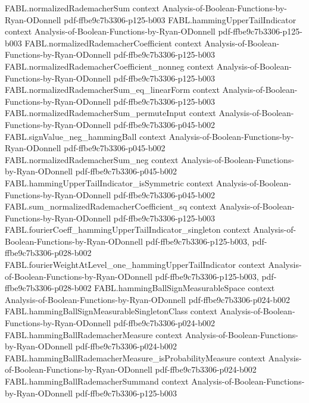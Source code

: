 \begin{theorem}
\proofstep
  {FABL.normalizedRademacherSum}
  {context}
  {Analysis-of-Boolean-Functions-by-Ryan-ODonnell}
  {pdf-ffbe9c7b3306-p125-b003}
\proofstep
  {FABL.hammingUpperTailIndicator}
  {context}
  {Analysis-of-Boolean-Functions-by-Ryan-ODonnell}
  {pdf-ffbe9c7b3306-p125-b003}
\proofstep
  {FABL.normalizedRademacherCoefficient}
  {context}
  {Analysis-of-Boolean-Functions-by-Ryan-ODonnell}
  {pdf-ffbe9c7b3306-p125-b003}
\proofstep
  {FABL.normalizedRademacherCoefficient_nonneg}
  {context}
  {Analysis-of-Boolean-Functions-by-Ryan-ODonnell}
  {pdf-ffbe9c7b3306-p125-b003}
\proofstep
  {FABL.normalizedRademacherSum_eq_linearForm}
  {context}
  {Analysis-of-Boolean-Functions-by-Ryan-ODonnell}
  {pdf-ffbe9c7b3306-p125-b003}
\proofstep
  {FABL.normalizedRademacherSum_permuteInput}
  {context}
  {Analysis-of-Boolean-Functions-by-Ryan-ODonnell}
  {pdf-ffbe9c7b3306-p045-b002}
\proofstep
  {FABL.signValue_neg_hammingBall}
  {context}
  {Analysis-of-Boolean-Functions-by-Ryan-ODonnell}
  {pdf-ffbe9c7b3306-p045-b002}
\proofstep
  {FABL.normalizedRademacherSum_neg}
  {context}
  {Analysis-of-Boolean-Functions-by-Ryan-ODonnell}
  {pdf-ffbe9c7b3306-p045-b002}
\proofstep
  {FABL.hammingUpperTailIndicator_isSymmetric}
  {context}
  {Analysis-of-Boolean-Functions-by-Ryan-ODonnell}
  {pdf-ffbe9c7b3306-p045-b002}
\proofstep
  {FABL.sum_normalizedRademacherCoefficient_sq}
  {context}
  {Analysis-of-Boolean-Functions-by-Ryan-ODonnell}
  {pdf-ffbe9c7b3306-p125-b003}
\proofstep
  {FABL.fourierCoeff_hammingUpperTailIndicator_singleton}
  {context}
  {Analysis-of-Boolean-Functions-by-Ryan-ODonnell}
  {pdf-ffbe9c7b3306-p125-b003,
    pdf-ffbe9c7b3306-p028-b002}
\proofstep
  {FABL.fourierWeightAtLevel_one_hammingUpperTailIndicator}
  {context}
  {Analysis-of-Boolean-Functions-by-Ryan-ODonnell}
  {pdf-ffbe9c7b3306-p125-b003,
    pdf-ffbe9c7b3306-p028-b002}
\proofstep
  {FABL.hammingBallSignMeasurableSpace}
  {context}
  {Analysis-of-Boolean-Functions-by-Ryan-ODonnell}
  {pdf-ffbe9c7b3306-p024-b002}
\proofstep
  {FABL.hammingBallSignMeasurableSingletonClass}
  {context}
  {Analysis-of-Boolean-Functions-by-Ryan-ODonnell}
  {pdf-ffbe9c7b3306-p024-b002}
\proofstep
  {FABL.hammingBallRademacherMeasure}
  {context}
  {Analysis-of-Boolean-Functions-by-Ryan-ODonnell}
  {pdf-ffbe9c7b3306-p024-b002}
\proofstep
  {FABL.hammingBallRademacherMeasure_isProbabilityMeasure}
  {context}
  {Analysis-of-Boolean-Functions-by-Ryan-ODonnell}
  {pdf-ffbe9c7b3306-p024-b002}
\proofstep
  {FABL.hammingBallRademacherSummand}
  {context}
  {Analysis-of-Boolean-Functions-by-Ryan-ODonnell}
  {pdf-ffbe9c7b3306-p125-b003}

\end{theorem}
